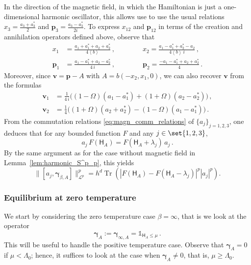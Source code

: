 \documentclass[11pt]{amsart}
\theoremstyle{plain}
\theoremstyle{definition}
\renewcommand	{\L}		{\mathcal L}		%
\newcommand		\sfH		{\mathsf H}			%
\newcommand		{\lt}			{\left}				%
\newcommand		{\rt}			{\right}			%
\renewcommand	{\(}			{\lt(}
\renewcommand	{\)}			{\rt)}
\newcommand		{\bangle}[1]	{\lt\langle #1\rt\rangle}
\newcommand		{\weight}[1]	{\bangle{#1}}	%
\newcommand		{\n}[1]			{\lt\lvert #1 \rt\rvert}
\newcommand		{\bnrm}[1]		{\big\lVert #1\big\rVert}	%
\newcommand		{\bNrm}[2]		{\bnrm{#1}_{#2}}
\newcommand		{\indic}	{\mathds{1}}		%
\DeclareMathOperator{\tr}		{Tr}				%
\newcommand		{\Tr}[1]		{\tr\!\( #1 \)}		%
\newcommand		{\hd}		{h^d}
\newcommand		{\opv}		{{\boldsymbol{v}}}
\newcommand		{\opgam}	{{\boldsymbol{\gamma}}}	%
\newcommand		{\opp}		{\boldsymbol{p}}
\begin{document}
    In the direction of the magnetic field, in which the Hamiltonian is just a one-dimensional harmonic oscillator, this allows use to  use the usual relations $x_3 = \frac{a_3+a_3^*}{2}$ and $\opp_3 = \frac{a_3-a_3^*}{2i}$. To express $x_{12}$ and $\opp_{12}$ in terms of the creation and annihilation operators defined above, observe that
    \begin{equation}\label{eq:xp_vs_a}
        \begin{aligned}
    	x_1 &= \frac{a_1+a_1^*+a_2+a_2^*}{4 \weight{b}} \, , \qquad \qquad x_2 = \frac{a_1-a_1^*+a_2^*-a_2}{4 \weight{b}\, i} \, , 
    	\\
    	\opp_1 &= \frac{a_1-a_1^*+a_2-a_2^*}{4\,i} \, , \qquad \qquad \opp_2 = \frac{-a_1-a_1^*+a_2+a_2^*}{4} \, .
        \end{aligned}
    \end{equation}
	Moreover, since $\opv = \opp - A$ with $A = b\lt(-x_2,x_1,0\rt)$, we can also recover $\opv$ from the formulas
	\begin{align*}
		\opv_1 &= \frac{1}{4\, i} \Big(\lt(1-\Omega\rt)\lt(a_1-a_1^*\rt)+\lt(1+\Omega\rt)\lt(a_2-a_2^*\rt)\Big)\,,
		\\
		\opv_2 &= \frac{1}{4}\Big(\lt(1+\Omega\rt)\lt(a_2+a_2^*\rt)-\lt(1-\Omega\rt)\lt(a_1-a_1^*\rt)\Big) \, .
	\end{align*}
	From the commutation relations \eqref{eq:magn_comm_relations} of $\{a_j\}_{j=1,2,3}$, one deduces that for any bounded function $F$ and any $j\in\set{1,2,3}$,
    \begin{equation*}
    	a_j\,F(\sfH_A) = F(\sfH_A+\lambda_j) \, a_j\, .
    \end{equation*}
    By the same argument as for the case without magnetic field in Lemma~\ref{lem:harmonic_S^p_p}, this yields
    \begin{equation}\label{eq:Spp_magnetic}
        \bNrm{[a_j,\opgam_{\beta,A}]}{\L^p}^p = \hd \Tr{\n{F(\sfH_A) - F(\sfH_A-\lambda_j)}^p \n{a_j}^p} .
    \end{equation}

\subsubsection{Equilibrium at zero temperature}

    We start by considering the zero temperature case $\beta=\infty$, that is we look at the operator
    \begin{equation*}
        \opgam_A := \opgam_{\infty,A} = \indic_{\sfH_A\leq \mu} \, .
    \end{equation*}
    This will be useful to handle the positive temperature case. Observe that $\opgam_A=0$ if $\mu<\Lambda_0$; hence, it suffices to look at the case when $\opgam_A\neq 0$, that is, $\mu \geq \Lambda_0$.
\end{document}
